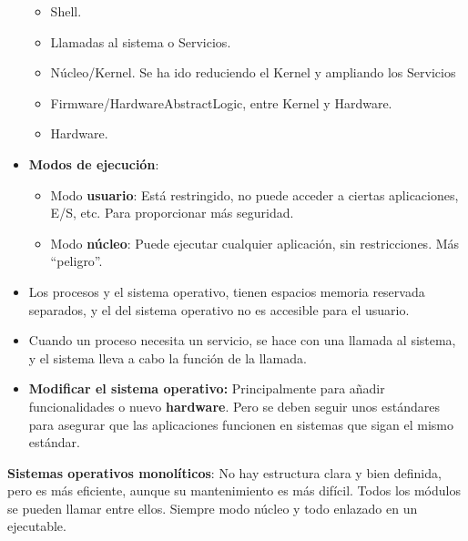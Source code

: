 \documentclass[12pt, twoside, openright]{report} %
\begin{document}
\begin{itemize}
\begin{itemize}
    \item Shell.
      
    \item Llamadas al sistema o Servicios.
      
    \item Núcleo/Kernel. Se ha ido reduciendo el Kernel y ampliando los
      Servicios
      
    \item Firmware/HardwareAbstractLogic, entre Kernel y Hardware.
      
    \item Hardware.
      
    \end{itemize}
  \item \textbf{Modos de ejecución}:
    

    \begin{itemize}
    \item Modo \textbf{usuario}: Está restringido, no puede acceder a
      ciertas aplicaciones, E/S, etc. Para proporcionar más seguridad.
      
    \item Modo \textbf{núcleo}: Puede ejecutar cualquier aplicación, sin
      restricciones. Más ``peligro''.
      
    \end{itemize}
  \item Los procesos y el sistema operativo, tienen espacios memoria
    reservada separados, y el del sistema operativo no es accesible para
    el usuario.
    
  \item Cuando un proceso necesita un servicio, se hace con una llamada al
    sistema, y el sistema lleva a cabo la función de la llamada.
    
  \item \textbf{Modificar el sistema operativo:} Principalmente para añadir
    funcionalidades o nuevo \textbf{hardware}. Pero se deben seguir unos
    estándares para asegurar que las aplicaciones funcionen en sistemas
    que sigan el mismo estándar.
    
  \end{itemize}
  
  \textbf{Sistemas operativos monolíticos}: No hay estructura clara y
  bien definida, pero es más eficiente, aunque su mantenimiento es más
  difícil. Todos los módulos se pueden llamar entre ellos. Siempre modo
  núcleo y todo enlazado en un ejecutable.
  
\end{document}
